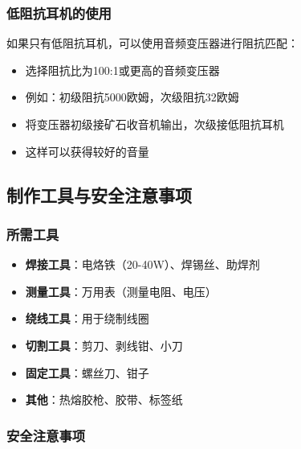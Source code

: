 \documentclass[12pt,UTF8]{ctexbook}
\begin{document}
\subsubsection{低阻抗耳机的使用}

如果只有低阻抗耳机，可以使用音频变压器进行阻抗匹配：
\begin{itemize}[leftmargin=3.5em]
    \item 选择阻抗比为100:1或更高的音频变压器
    \item 例如：初级阻抗5000欧姆，次级阻抗32欧姆
    \item 将变压器初级接矿石收音机输出，次级接低阻抗耳机
    \item 这样可以获得较好的音量
\end{itemize}

\subsection{制作工具与安全注意事项}

\subsubsection{所需工具}

\begin{itemize}[leftmargin=3.5em]
    \item \textbf{焊接工具}：电烙铁（20-40W）、焊锡丝、助焊剂
    \item \textbf{测量工具}：万用表（测量电阻、电压）
    \item \textbf{绕线工具}：用于绕制线圈
    \item \textbf{切割工具}：剪刀、剥线钳、小刀
    \item \textbf{固定工具}：螺丝刀、钳子
    \item \textbf{其他}：热熔胶枪、胶带、标签纸
\end{itemize}

\subsubsection{安全注意事项}
\end{document}
